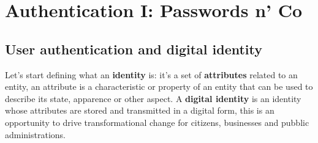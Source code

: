 \section{Authentication I: Passwords n' Co}
    \subsection{User authentication and digital identity}
    Let's start defining what an \textbf{identity} is: it's a set of \textbf{attributes} related to an entity, an attribute is a characteristic or property of an entity that can be used to describe its state, apparence or other aspect. A 
    \textbf{digital identity} is an identity whose attributes are stored and transmitted in a digital form, this is an opportunity to drive transformational change for citizens, businesses and pubblic administrations.
    
